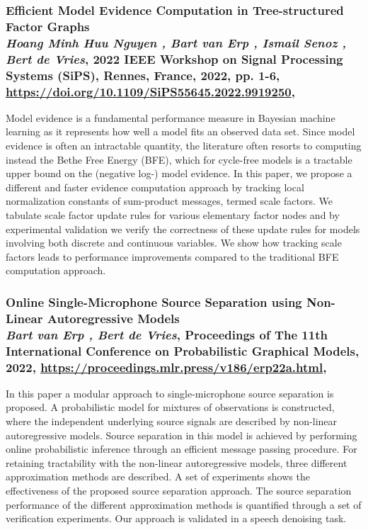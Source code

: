 \subsubsection*{Efficient Model Evidence Computation in Tree-structured Factor Graphs\\{\small \normalfont \textit{Hoang Minh Huu Nguyen , Bart van Erp , Ismail Senoz , Bert de Vries}, 2022 IEEE Workshop on Signal Processing Systems (SiPS), Rennes, France, 2022, pp. 1-6, \url{https://doi.org/10.1109/SiPS55645.2022.9919250}, \citep{nguyen_efficient_2022}}}

Model evidence is a fundamental performance measure in Bayesian machine learning as it
represents how well a model fits an observed data set.
Since model evidence is often an intractable quantity, the literature often resorts to
computing instead the Bethe Free Energy (BFE), which for cycle-free models is a tractable
upper bound on the (negative log-) model evidence.
In this paper, we propose a different and faster evidence computation approach by tracking
local normalization constants of sum-product messages, termed scale factors.
We tabulate scale factor update rules for various elementary factor nodes and by experimental
validation we verify the correctness of these update rules for models involving both discrete
and continuous variables.
We show how tracking scale factors leads to performance improvements compared to the
traditional BFE computation approach.

\subsubsection*{Online Single-Microphone Source Separation using Non-Linear Autoregressive Models\\{\small \normalfont \textit{Bart van Erp , Bert de Vries}, Proceedings of The 11th International Conference on Probabilistic Graphical Models, 2022, \url{https://proceedings.mlr.press/v186/erp22a.html}, \citep{van_erp_online_2022}}}

In this paper a modular approach to single-microphone source separation is proposed.
A probabilistic model for mixtures of observations is constructed, where the independent
underlying source signals are described by non-linear autoregressive models.
Source separation in this model is achieved by performing online probabilistic inference
through an efficient message passing procedure.
For retaining tractability with the non-linear autoregressive models, three different
approximation methods are described.
A set of experiments shows the effectiveness of the proposed source separation approach.
The source separation performance of the different approximation methods is quantified through
a set of verification experiments.
Our approach is validated in a speech denoising task.

